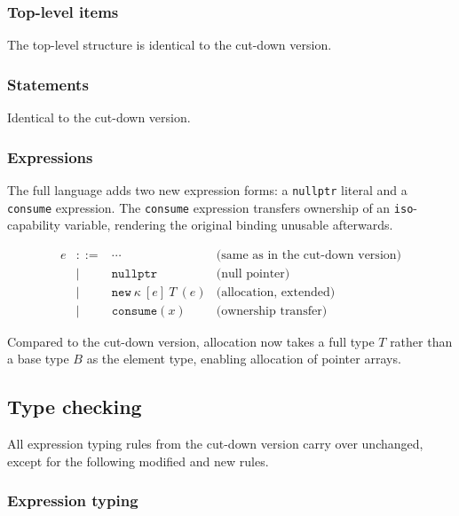 \documentclass[a4paper,12pt,fleqn]{article}
\begin{document}
\subsubsection{Top-level items}
The top-level structure is identical to the cut-down version.


\subsubsection{Statements}

Identical to the cut-down version.

\subsubsection{Expressions}

The full language adds two new expression forms: a \texttt{nullptr} literal and a \texttt{consume} expression. The \texttt{consume} expression transfers ownership of an \texttt{iso}-capability variable, rendering the original binding unusable afterwards.

\[
\begin{array}{lcll}
e & ::= & \cdots & \text{(same as in the cut-down version)} \\
  & \mid & \mathtt{nullptr} & \text{(null pointer)} \\
  & \mid & \mathtt{new}\ \kappa\ [e]\ T\ (e) & \text{(allocation, extended)} \\
  & \mid & \mathtt{consume}(x) & \text{(ownership transfer)}
\end{array}
\]


Compared to the cut-down version, allocation now takes a full type $T$ rather than a base type $B$ as the element type, enabling allocation of pointer arrays.


\subsection{Type checking}

All expression typing rules from the cut-down version carry over unchanged, except for the following modified and new rules.

\subsubsection{Expression typing}
\end{document}
